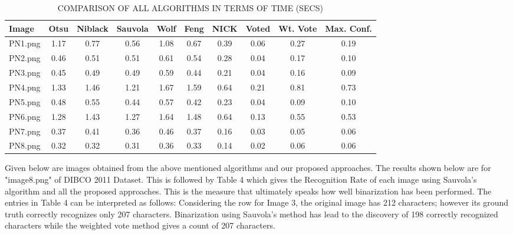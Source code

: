 \documentclass[conference]{IEEEtran}
\begin{document}
\begin{table}[!t]
\caption{COMPARISON OF ALL ALGORITHMS IN TERMS OF TIME (SECS)}
\centering
\begin{tabular}{|l|c|c|c|c|c|c|c|c|c|}
\hline
Image & Otsu & Niblack & Sauvola & Wolf & Feng & NICK & Voted & Wt. Vote & Max. Conf. \\
\hline
PN1.png & 1.17 & 0.77 & 0.56 & 1.08 & 0.67 & 0.39 & 0.06 & 0.27 & 0.19 \\
PN2.png & 0.46 & 0.51 & 0.51 & 0.61 & 0.54 & 0.28 & 0.04 & 0.17 & 0.10 \\
PN3.png & 0.45 & 0.49 & 0.49 & 0.59 & 0.44 & 0.21 & 0.04 & 0.16 & 0.09 \\
PN4.png & 1.33 & 1.46 & 1.21 & 1.67 & 1.59 & 0.64 & 0.21 & 0.81 & 0.73 \\
PN5.png & 0.48 & 0.55 & 0.44 & 0.57 & 0.42 & 0.23 & 0.04 & 0.09 & 0.10 \\
PN6.png & 1.28 & 1.43 & 1.27 & 1.64 & 1.48 & 0.64 & 0.13 & 0.55 & 0.53 \\
PN7.png & 0.37 & 0.41 & 0.36 & 0.46 & 0.37 & 0.16 & 0.03 & 0.05 & 0.06 \\
PN8.png & 0.32 & 0.32 & 0.31 & 0.36 & 0.33 & 0.14 & 0.02 & 0.06 & 0.06 \\
\hline
\end{tabular}
\label{tab:time}
\end{table}

Given below are images obtained from the above mentioned algorithms and our proposed approaches. The results shown below are for "image8.png" of DIBCO 2011 Dataset. This is followed by Table 4 which gives the Recognition Rate of each image using Sauvola's algorithm and all the proposed approaches. This is the measure that ultimately speaks how well binarization has been performed. The entries in Table 4 can be interpreted as follows: Considering the row for Image 3, the original image has 212 characters; however its ground truth correctly recognizes only 207 characters. Binarization using Sauvola's method has lead to the discovery of 198 correctly recognized characters while the weighted vote method gives a count of 207 characters.
\end{document}
